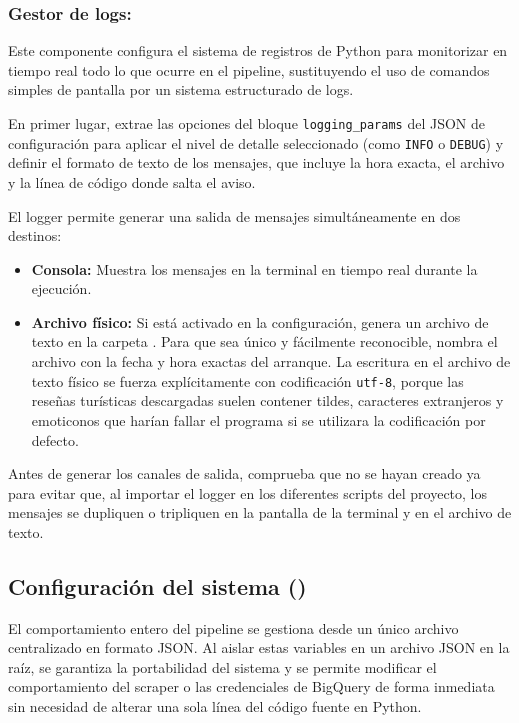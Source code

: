 \subsubsection{Gestor de logs: }
Este componente configura el sistema de registros de Python para monitorizar en tiempo real todo lo que ocurre en el pipeline, sustituyendo el uso de comandos simples de pantalla por un sistema estructurado de logs.

En primer lugar, extrae las opciones del bloque \texttt{logging\_params} del JSON de configuración para aplicar el nivel de detalle seleccionado (como \texttt{INFO} o \texttt{DEBUG}) y definir el formato de texto de los mensajes, que incluye la hora exacta, el archivo y la línea de código donde salta el aviso.

El logger permite generar una salida de mensajes simultáneamente en dos destinos:
\begin{itemize}
    \item \textbf{Consola:} Muestra los mensajes en la terminal en tiempo real durante la ejecución.
    \item \textbf{Archivo físico:} Si está activado en la configuración, genera un archivo de texto en la carpeta . Para que sea único y fácilmente reconocible, nombra el archivo con la fecha y hora exactas del arranque. La escritura en el archivo de texto físico se fuerza explícitamente con codificación \texttt{utf-8}, porque las reseñas turísticas descargadas suelen contener tildes, caracteres extranjeros y emoticonos que harían fallar el programa si se utilizara la codificación por defecto.
\end{itemize}

Antes de generar los canales de salida, comprueba que no se hayan creado ya para evitar que, al importar el logger en los diferentes scripts del proyecto, los mensajes se dupliquen o tripliquen en la pantalla de la terminal y en el archivo de texto.


\subsection{Configuración del sistema ()}
El comportamiento entero del pipeline se gestiona desde un único archivo centralizado en formato JSON. Al aislar estas variables en un archivo JSON en la raíz, se garantiza la portabilidad del sistema y se permite modificar el comportamiento del scraper o las credenciales de BigQuery de forma inmediata sin necesidad de alterar una sola línea del código fuente en Python.

